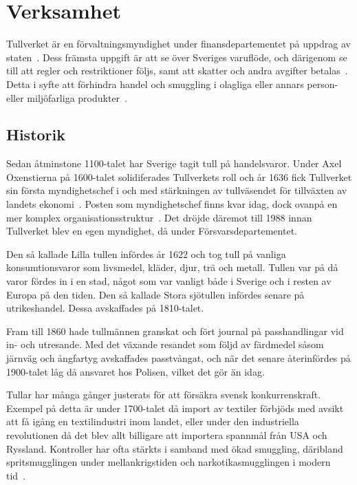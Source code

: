 \section{Verksamhet}

Tullverket är en förvaltningsmyndighet under finansdepartementet på
uppdrag av staten~\cite{styrning}. Dess främsta uppgift är att se över Sveriges
varuflöde, och därigenom se till att regler och restriktioner följs, samt att
skatter och andra avgifter betalas~\cite{verksamhet}.
%
Detta i syfte att förhindra handel och smuggling i olagliga eller annars
person- eller miljöfarliga produkter~\cite{wikipedia}.

\subsection{Historik}

Sedan åtminstone 1100-talet har Sverige tagit tull på handelsvaror. Under
Axel Oxenstierna på 1600-talet solidiferades Tullverkets roll och år 1636
fick Tullverket sin första myndighetschef i och med stärkningen av tullväsendet
för tillväxten av landets ekonomi~\cite{wikipedia}. Posten som myndighetschef
finns kvar idag, dock ovanpå en mer komplex
organisationsstruktur~\cite{forordning}. Det dröjde däremot till 1988 innan
Tullverket blev en egen myndighet, då under Försvarsdepartementet.

Den så kallade Lilla tullen infördes år 1622 och tog tull på vanliga
konsumtionsvaror som livsmedel, kläder, djur, trä och metall. Tullen var på
då varor fördes in i en stad, något som var vanligt både i Sverige och i resten
av Europa på den tiden. Den så kallade Stora sjötullen infördes senare på
utrikeshandel. Dessa avskaffades på 1810-talet.

Fram till 1860 hade tullmännen granskat och fört journal på passhandlingar vid
in- och utresande. Med det växande resandet som följd av färdmedel såsom
järnväg och ångfartyg avskaffades passtvångat, och när det senare återinfördes
på 1900-talet låg då ansvaret hos Polisen, vilket det gör än idag.

Tullar har många gånger justerats för att försäkra svensk konkurrenskraft.
Exempel på detta är under 1700-talet då import av textiler förbjöds med avsikt
att få igång en textilindustri inom landet, eller under den industriella
revolutionen då det blev allt billigare att importera spannmål från USA
och Ryssland.
%
Kontroller har ofta stärkts i samband med ökad smuggling, däribland
spritsmugglingen under mellankrigstiden och narkotikasmugglingen i modern
tid~\cite{historik}.

